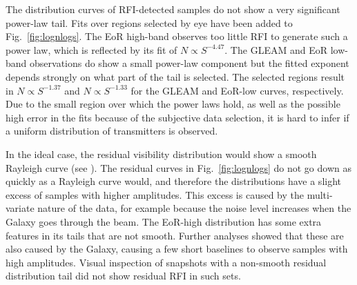 \documentclass{pasa}
\begin{document}
The distribution curves of RFI-detected samples do not show a very significant power-law tail. Fits over regions selected by eye have been added to Fig.~\ref{fig:lognlogs}. The EoR high-band observes too little RFI to generate such a power law, which is reflected by its fit of $N\propto S^{-4.47}$. The GLEAM and EoR low-band observations do show a small power-law component but the fitted exponent depends strongly on what part of the tail is selected. The selected regions result in $N\propto S^{-1.37}$ and $N\propto S^{-1.33}$ for the GLEAM and EoR-low curves, respectively. Due to the small region over which the power laws hold, as well as the possible high error in the fits because of the subjective data selection, it is hard to infer if a uniform distribution of transmitters is observed.

In the ideal case, the residual visibility distribution would show a smooth Rayleigh curve (see \citealt{offringa-rfi-distributions}). The residual curves in Fig.~\ref{fig:lognlogs} do not go down as quickly as a Rayleigh curve would, and therefore the distributions have a slight excess of samples with higher amplitudes. This excess is caused by the multi-variate nature of the data, for example because the noise level increases when the Galaxy goes through the beam. The EoR-high distribution has some extra features in its tails that are not smooth. Further analyses showed that these are also caused by the Galaxy, causing a few short baselines to observe samples with high amplitudes. Visual inspection of snapshots with a non-smooth residual distribution tail did not show residual RFI in such sets.
\end{document}
